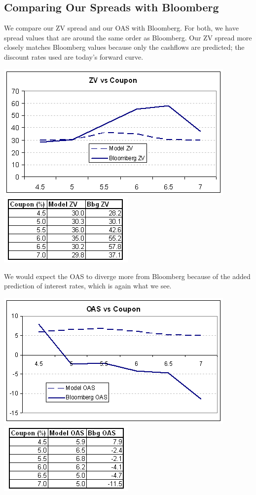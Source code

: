 \documentclass[10pt,letterpaper]{article}
\begin{document}
\subsection{Comparing Our Spreads with Bloomberg}
We compare our ZV spread and our OAS with Bloomberg. For both, we have spread values that are around the same order as Bloomberg. Our ZV spread more closely matches Bloomberg values because only the cashflows are predicted; the discount rates used are today's forward curve.
\begin{center}
\includegraphics[scale=0.5]{zvvscpn.png}
\includegraphics[scale=0.5]{zvvscpntable.png}\\
\end{center}
We would expect the OAS to diverge more from Bloomberg because of the added prediction of interest rates, which is again what we see.
\begin{center}
\includegraphics[scale=0.5]{oasvscpn.png}
\includegraphics[scale=0.5]{oasvscpntable.png}\\
\end{center}
\end{document}

